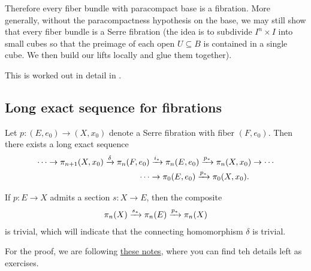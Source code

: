 \documentclass{article}[11pt]
\begin{document}
Therefore every fiber bundle with paracompact base is a fibration. More generally, without the paracompactness hypothesis on the base, we may still show that every fiber bundle is a Serre fibration (the idea is to subdivide $I^n\times I$ into small cubes so that the preimage of each open $U\subseteq B$ is contained in a single cube. We then build our lifts locally and glue them together).

This is worked out in detail in  \cite[VII, Section 4]{may}.





\subsection{Long exact sequence for fibrations}

\begin{theorem} Let $p: (E,e_0) \to (X,x_0)$ denote a Serre fibration with fiber $(F,e_0)$. Then there exists a long exact sequence
\begin{align*}
	\cdots \to \pi_{n+1} (X,x_0) \xrightarrow{\delta} \pi_n(F,e_0) &\xrightarrow{i_\ast} \pi_n(E,e_0) \xrightarrow{p_\ast} \pi_n(X,x_0) \to \cdots \\
	\cdots &\to \pi_0(E,e_0) \xrightarrow{p_\ast} \pi_0(X,x_0).
\end{align*}
\end{theorem}

\begin{note} If $p \colon E\to X$ admits a section $s\colon X \to E$, then the composite
\begin{align*}
	\pi_n(X) \xrightarrow{s_\ast} \pi_n(E) \xrightarrow{p_\ast} \pi_n(X)
\end{align*}
is trivial, which will indicate that the connecting homomorphism $\delta$ is trivial.
\end{note}


For the proof, we are following \href{https://www.math.ru.nl/~gutierrez/files/Lecture05.pdf}{these notes}, where you can find teh details left as exercises.
\end{document}
